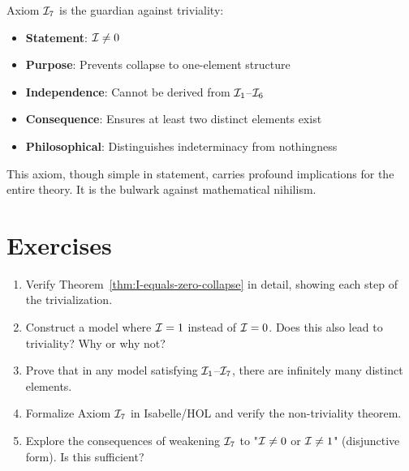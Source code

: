 Axiom $\mathcal{I}_7$ is the guardian against triviality:

\begin{itemize}
    \item \textbf{Statement}: $\mathcal{I} \neq 0$
    \item \textbf{Purpose}: Prevents collapse to one-element structure
    \item \textbf{Independence}: Cannot be derived from $\mathcal{I}_1$--$\mathcal{I}_6$
    \item \textbf{Consequence}: Ensures at least two distinct elements exist
    \item \textbf{Philosophical}: Distinguishes indeterminacy from nothingness
\end{itemize}

This axiom, though simple in statement, carries profound implications for the entire theory. It is the bulwark against mathematical nihilism.

\section{Exercises}

\begin{enumerate}
    \item Verify Theorem~\ref{thm:I-equals-zero-collapse} in detail, showing each step of the trivialization.
    
    \item Construct a model where $\mathcal{I} = 1$ instead of $\mathcal{I} = 0$. Does this also lead to triviality? Why or why not?
    
    \item Prove that in any model satisfying $\mathcal{I}_1$--$\mathcal{I}_7$, there are infinitely many distinct elements.
    
    \item Formalize Axiom $\mathcal{I}_7$ in Isabelle/HOL and verify the non-triviality theorem.
    
    \item Explore the consequences of weakening $\mathcal{I}_7$ to "$\mathcal{I} \neq 0$ or $\mathcal{I} \neq 1$" (disjunctive form). Is this sufficient?
\end{enumerate}
